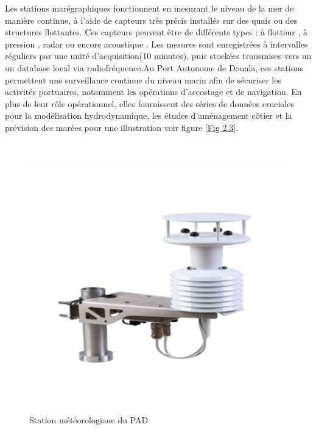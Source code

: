 \documentclass[a4paper,12pt,openany]{report}
\begin{document}
			\quad Les stations marégraphiques fonctionnent en mesurant le niveau de la mer de manière continue, à l’aide de capteurs très précis installés sur des quais ou des structures flottantes. Ces capteurs peuvent être de différents types : à flotteur  , à pression  , radar ou encore acoustique  . Les mesures sont enregistrées à intervalles réguliers par une unité d’acquisition(10 minutes), puis stockées   transmises vers un un database local via radiofréquence.Au Port Autonome de Douala, ces stations permettent une surveillance continue du niveau marin afin de sécuriser les activités portuaires, notamment les opérations d’accostage et de navigation. En plus de leur rôle opérationnel, elles fournissent des séries de données cruciales pour la modélisation hydrodynamique, les études d’aménagement côtier et la prévision des marées pour une illustration voir figure \ref{Fig 2.3}.
			\begin{figure}[H]
			\begin{center}
                \begin{minipage}{\textwidth}
	    	     \begin{center}
	    	      \includegraphics[width=1\textwidth,height=4.6in]{images/Station_meteo_pad.png}
	    	      \end{center}
	    	     \end{minipage}
					
					
					\caption{Station météorologiaue du PAD\label{Fig 2.2}}
				\end{center}
			\end{figure}	
		
\end{document}
